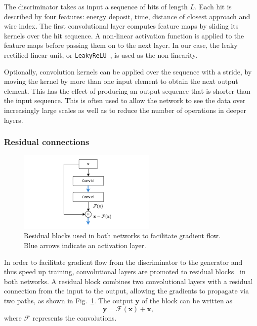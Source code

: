 The discriminator takes as input a sequence of hits of length $L$. Each hit is described by four features: energy deposit, time, distance of closest approach and wire index. The first convolutional layer computes feature maps by sliding its kernels over the hit sequence. A non-linear activation function is applied to the feature maps before passing them on to the next layer. 
In our case, the leaky rectified linear unit, or \texttt{LeakyReLU}~\cite{Maas13rectifiernonlinearities}, is used as the non-linearity.

Optionally, convolution kernels can be applied over the sequence with a stride, by moving the kernel by more than one input element to obtain the next output element. This has the effect of producing an output sequence that is shorter than the input sequence. This is often used to allow the network to see the data over increasingly large scales as well as to reduce the number of operations in deeper layers. 

\subsubsection{Residual connections}
\begin{figure}
    \centering
    \includegraphics[width=0.6\textwidth]{chapter4/residual_sel.drawio.pdf}
    \caption{Residual blocks used in both networks to facilitate gradient flow. Blue arrows indicate an activation layer.}
    \label{fig:residual_block}
\end{figure}
In order to facilitate gradient flow from the discriminator to the generator and thus speed up training, convolutional layers are promoted to residual blocks~\cite{he2016deep} in both networks. A residual block combines two convolutional layers with a residual connection from the input to the output, allowing the gradients to propagate via two paths, as shown in Fig.~\ref{fig:residual_block}. The output $\mathbf{y}$ of the block can be written as
\begin{equation*}
    \mathbf{y} = \mathcal{F}(\mathbf{x}) + \mathbf{x},
\end{equation*}
where $\mathcal{F}$ represents the convolutions. %
    
